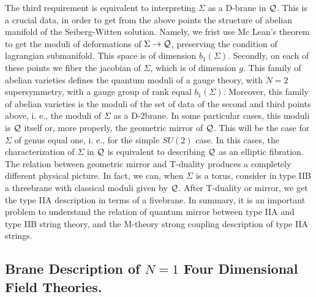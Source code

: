 The third requirement is equivalent to interpreting $\Sigma$ as a
D-brane in ${\cal Q}$. This is a crucial data, in order to get
from the above points the structure of abelian manifold of the
Seiberg-Witten solution. Namely, we frist use Mc Lean's theorem
to get the moduli of deformations of $\Sigma \rightarrow {\cal
Q}$, preserving the condition of lagrangian submanifold. This
space is of dimension $b_1(\Sigma)$. Secondly, on each of these
points we fiber the jacobian of $\Sigma$, which is of dimension
$g$. This family of abelian varieties defines the quantum moduli
of a gauge theory, with $N=2$ supersymmetry, with a gauge group
of rank equal $b_1(\Sigma)$. Moreover, this family of abelian
varieties is the moduli of the set of data of the second and third points
above, i. e., the moduli of $\Sigma$ as a D-$2$brane. In some
particular cases, this moduli is ${\cal Q}$ itself or, more
properly, the geometric mirror of ${\cal Q}$. This will be the
case for $\Sigma$ of genus equal one, i. e., for the simple
$SU(2)$ case. In this cases, the characterization of $\Sigma$ in
${\cal Q}$ is equivalent to describing ${\cal Q}$ as an elliptic
fibration. The relation between geometric mirror and T-duality
produces a completely different physical picture. In fact, we
can, when $\Sigma$ is a torus, consider in type IIB a threebrane
with classical moduli given by ${\cal Q}$. After T-duality or
mirror, we get the type IIA description in terms of a fivebrane.
In summary, it is an important problem to understand the relation
of quantum mirror between type IIA and type IIB string theory,
and the M-theory strong coupling description of type IIA strings.
  
\subsection{Brane Description of $N=1$ Four Dimensional Field
Theories.}

